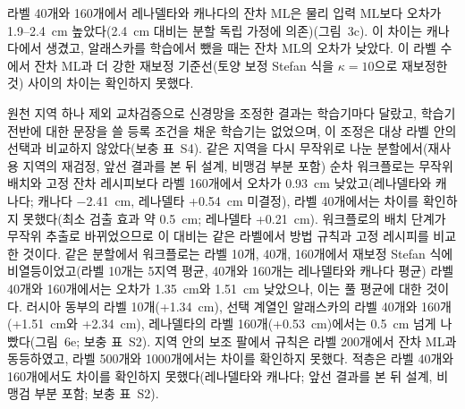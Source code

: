 라벨 40개와 160개에서 레나델타와 캐나다의 잔차 ML은 물리 입력 ML보다 오차가 1.9--2.4~cm 높았다(2.4~cm 대비는 분할 독립 가정에 의존)(그림~3c).
이 차이는 캐나다에서 생겼고, 알래스카를 학습에서 뺐을 때는 잔차 ML의 오차가 낮았다.
이 라벨 수에서 잔차 ML과 더 강한 재보정 기준선(토양 보정 Stefan 식을 $\kappa = 10$으로 재보정한 것) 사이의 차이는 확인하지 못했다.

원천 지역 하나 제외 교차검증으로 신경망을 조정한 결과는 학습기마다 달랐고, 학습기 전반에 대한 문장을 쓸 등록 조건을 채운 학습기는 없었으며, 이 조정은 대상 라벨 안의 선택과 비교하지 않았다(보충 표~S4).
같은 지역을 다시 무작위로 나눈 분할에서(재사용 지역의 재검정, 앞선 결과를 본 뒤 설계, 비맹검 부분 포함) 순차 워크플로는 무작위 배치와 고정 잔차 레시피보다 라벨 160개에서 오차가 0.93~cm 낮았고(레나델타와 캐나다; 캐나다 −2.41~cm, 레나델타 +0.54~cm 미결정), 라벨 40개에서는 차이를 확인하지 못했다(최소 검출 효과 약 0.5~cm; 레나델타 +0.21~cm). 워크플로의 배치 단계가 무작위 추출로 바뀌었으므로 이 대비는 같은 라벨에서 방법 규칙과 고정 레시피를 비교한 것이다.
같은 분할에서 워크플로는 라벨 10개, 40개, 160개에서 재보정 Stefan 식에 비열등이었고(라벨 10개는 5지역 평균, 40개와 160개는 레나델타와 캐나다 평균) 라벨 40개와 160개에서는 오차가 1.35~cm와 1.51~cm 낮았으나, 이는 풀 평균에 대한 것이다. 러시아 동부의 라벨 10개(+1.34~cm), 선택 계열인 알래스카의 라벨 40개와 160개(+1.51~cm와 +2.34~cm), 레나델타의 라벨 160개(+0.53~cm)에서는 0.5~cm 넘게 나빴다(그림~6e; 보충 표~S2).
지역 안의 보조 팔에서 규칙은 라벨 200개에서 잔차 ML과 동등하였고, 라벨 500개와 1000개에서는 차이를 확인하지 못했다.
적층은 라벨 40개와 160개에서도 차이를 확인하지 못했다(레나델타와 캐나다; 앞선 결과를 본 뒤 설계, 비맹검 부분 포함; 보충 표~S2).
